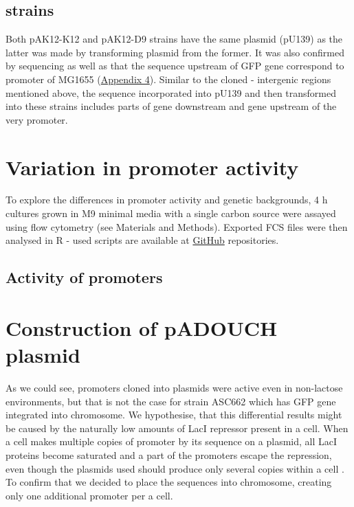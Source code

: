\subsection{ strains}
Both pA\textunderscore K12-K12 and pA\textunderscore K12-D9 strains have the same plasmid (pU139) as the latter was made by transforming plasmid from the former.
It was also confirmed by sequencing as well as that the sequence upstream of GFP gene correspond to  promoter of MG1655 (\hyperlink{precAalign}{Appendix 4}).
Similar to the cloned - intergenic regions mentioned above, the sequence incorporated into pU139 and then transformed into these  strains includes parts of  gene downstream and  gene upstream of the very promoter.


\section{Variation in promoter activity}
To explore the differences in promoter activity and genetic backgrounds, 4 h cultures grown in M9 minimal media with a single carbon source were assayed using flow cytometry (see Materials and Methods).
Exported FCS files were then analysed in R - used scripts are available at \href{https://github.com/marketavlkova/}{GitHub} repositories.

\subsection{Activity of  promoters}



\section{Construction of pADOUCH plasmid}
As we could see,  promoters cloned into plasmids were active even in non-lactose environments, but that is not the case for strain ASC662 which has GFP gene integrated into chromosome.
We hypothesise, that this differential results might be caused by the naturally low amounts of LacI repressor present in a cell.
When a cell makes multiple copies of  promoter by its sequence on a plasmid, all LacI proteins become saturated and a part of the promoters escape the repression, even though the plasmids used should produce only several copies within a cell \cite{zaslaver2006comprehensive}.
To confirm that we decided to place the  sequences into chromosome, creating only one additional  promoter per a cell.

